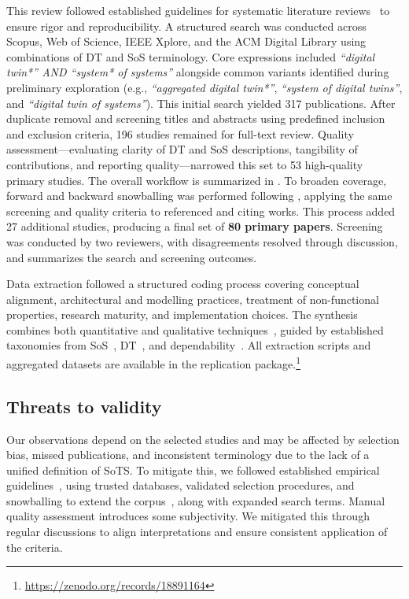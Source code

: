This review followed established guidelines for systematic literature reviews~\cite{kitchenham2007guidelines, wohlin2020guidelines} to ensure rigor and reproducibility. A structured search was conducted across Scopus, Web of Science, IEEE Xplore, and the ACM Digital Library using combinations of DT and SoS terminology. Core expressions included \textit{“digital twin*” AND “system* of systems”} alongside common variants identified during preliminary exploration (e.g., \textit{“aggregated digital twin*”}, \textit{“system of digital twins”}, and \textit{“digital twin of systems”}). This initial search yielded 317 publications. After duplicate removal and screening titles and abstracts using predefined inclusion and exclusion criteria, 196 studies remained for full-text review. Quality assessment---evaluating clarity of DT and SoS descriptions, tangibility of contributions, and reporting quality---narrowed this set to 53 high-quality primary studies. The overall workflow is summarized in . To broaden coverage, forward and backward snowballing was performed following \citet{wohlin2020guidelines}, applying the same screening and quality criteria to referenced and citing works. This process added 27 additional studies, producing a final set of \textbf{80 primary papers}. Screening was conducted by two reviewers, with disagreements resolved through discussion, and  summarizes the search and screening outcomes.



Data extraction followed a structured coding process covering conceptual alignment, architectural and modelling practices, treatment of non-functional properties, research maturity, and implementation choices. The synthesis combines both quantitative and qualitative techniques~\cite{franzosi2010quantitative, rodgers2009testing}, guided by established taxonomies from SoS~\cite{nielsen2015systems}, DT~\cite{kritzinger2018digital, david2024infonomics}, and dependability~\cite{avizienis2004basic}. All extraction scripts and aggregated datasets are available in the replication package.\footnote{\url{https://zenodo.org/records/18891164}}


\subsection{Threats to validity}\label{sec:literature-review-threats}
Our observations depend on the selected studies and may be affected by selection bias, missed publications, and inconsistent terminology due to the lack of a unified definition of SoTS. To mitigate this, we followed established empirical guidelines~\cite{wohlin2020guidelines}, using trusted databases, validated selection procedures, and snowballing to extend the corpus~\cite{greenhalgh2005effectiveness}, along with expanded search terms. Manual quality assessment introduces some subjectivity. We mitigated this through regular discussions to align interpretations and ensure consistent application of the criteria.

